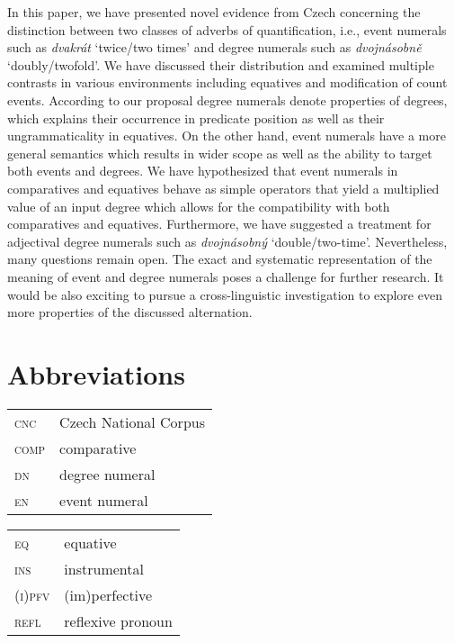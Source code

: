 \documentclass[output=paper,
modfonts,
hidelinks,
newtxmath
]{langscibook}
\begin{document}
In this paper, we have presented novel evidence from Czech concerning the distinction between two classes of adverbs of quantification, i.e., event numerals such as \textit{dvakrát} `twice/two times' and degree numerals such as \textit{dvojnásobně} `doubly/twofold'. We have discussed their distribution and examined multiple contrasts in various environments including equatives and modification of count events. According to our proposal degree numerals denote properties of degrees, which explains their occurrence in predicate position as well as their ungrammaticality in equatives. On the other hand, event numerals have a more general semantics which results in wider scope as well as the ability to target both events and degrees. We have hypothesized that event numerals in comparatives and equatives behave as simple operators that yield a multiplied value of an input degree which allows for the compatibility with both comparatives and equatives. Furthermore, we have suggested a treatment for adjectival degree numerals such as \textit{dvojnásobný} `double/two-time'. Nevertheless, many questions remain open. The exact and systematic representation of the meaning of event and degree numerals poses a challenge for further research. It would be also exciting to pursue a cross-linguistic investigation to explore even more properties of the discussed alternation.

\section*{Abbreviations}

\begin{tabularx}{.5\textwidth}{@{}lQ@{}}
\textsc{cnc}&Czech National Corpus\\
\textsc{comp}&comparative\\
\textsc{dn}&degree numeral\\
\textsc{en}&event numeral\\
\end{tabularx}%
\begin{tabularx}{.5\textwidth}{@{}lQ@{}}
\textsc{eq}&equative\\
\textsc{ins}&instrumental\\
\textsc{(i)pfv}&(im)perfective\\
\textsc{refl}&reflexive pronoun\\
\end{tabularx}
\end{document}

